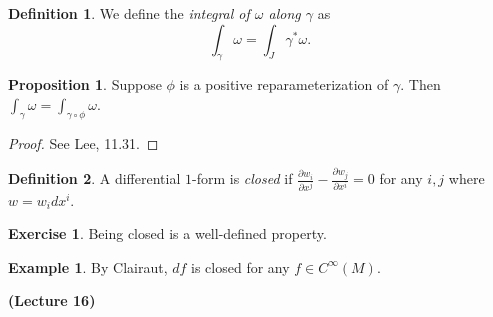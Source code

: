 \documentclass[10pt,letterpaper,cm]{nupset}
\theoremstyle{definition}
\newtheorem*{definition}{Definition}
\newtheorem{exmp}{Example}
\newtheorem{exercise}{Exercise}
\newtheorem{prop}{Proposition}
\newcommand{\1}{\mathbf{1}}
\newcommand{\0}{\vec 0}
\begin{document}
\begin{definition}
We define the \textit{integral of $\omega$ along $\gamma$} as $$\int_{\gamma} \omega = \int_J \gamma^{\ast}\omega.$$ 
\end{definition}

\begin{prop}
Suppose $\phi$ is a positive reparameterization of $\gamma$. Then $\int_{\gamma} \omega = \int_{\gamma \circ \phi} \omega$.
\end{prop}
\begin{proof}
See Lee, 11.31.
\end{proof}

\begin{definition}
A differential $1$-form is \textit{closed} if $\frac{\partial{w_i}}{\partial{x^j}} - \frac{\partial{w_j}}{\partial{x^i}} =0$ for any $i,j$ where $w = w_i dx^i$.
\end{definition}

\begin{exercise}
Being closed is a well-defined property.
\end{exercise}

\begin{exmp}
By Clairaut, $df$ is closed for any $f\in C^{\infty}(M)$. 
\end{exmp}

\begin{center}
{\textbf{(Lecture 16)}} 
\end{center}
\end{document}
